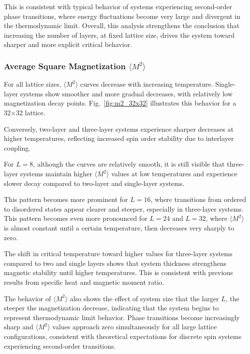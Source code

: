 This is consistent with typical behavior of systems experiencing second-order phase transitions, where energy fluctuations become very large and divergent in the thermodynamic limit. Overall, this analysis strengthens the conclusion that increasing the number of layers, at fixed lattice size, drives the system toward sharper and more explicit critical behavior.

\subsubsection{Average Square Magnetization $\langle M^2 \rangle$}

For all lattice sizes, $\langle M^2 \rangle$ curves decrease with increasing temperature. Single-layer systems show smoother and more gradual decreases, with relatively low magnetization decay points. Fig.~\ref{fig:m2_32x32} illustrates this behavior for a 32×32 lattice.

Conversely, two-layer and three-layer systems experience sharper decreases at higher temperatures, reflecting increased spin order stability due to interlayer coupling.

For $L = 8$, although the curves are relatively smooth, it is still visible that three-layer systems maintain higher $\langle M^2 \rangle$ values at low temperatures and experience slower decay compared to two-layer and single-layer systems.

This pattern becomes more prominent for $L = 16$, where transitions from ordered to disordered states appear clearer and steeper, especially in three-layer systems. This pattern becomes even more pronounced for $L = 24$ and $L = 32$, where $\langle M^2 \rangle$ is almost constant until a certain temperature, then decreases very sharply to zero.

The shift in critical temperature toward higher values for three-layer systems compared to two and single layers shows that system thickness strengthens magnetic stability until higher temperatures. This is consistent with previous results from specific heat and magnetic moment ratio.

The behavior of $\langle M^2 \rangle$ also shows the effect of system size that the larger $L$, the steeper the magnetization decrease, indicating that the system begins to represent thermodynamic limit behavior. Phase transitions become increasingly sharp and $\langle M^2 \rangle$ values approach zero simultaneously for all large lattice configurations, consistent with theoretical expectations for discrete spin systems experiencing second-order transitions.

